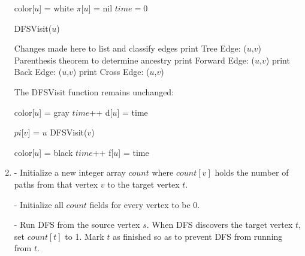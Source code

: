 \documentclass[a4paper]{report}
\begin{document}
\begin{enumerate}
    \begin{algorithmic}
        \State color[$u$] = white
        \State $\pi$[$u$] = nil
      \EndFor
      \State $time=0$


          \State DFSVisit($u$)
        \EndIf
      \EndFor

      \Comment Changes made here to list and classify edges
          \State print Tree Edge: ($u$,$v$)
        \Else 
          \Comment Parenthesis theorem to determine ancestry
            \State print Forward Edge: ($u$,$v$)
            \State print Back Edge: ($u$,$v$)
          \Else
            \State print Cross Edge: ($u$,$v$)
          \EndIf
        \EndIf
      \EndFor

    \EndFunction
    \end{algorithmic}

    The DFSVisit function remains unchanged:

    \begin{algorithmic}
      \State color[$u$] = gray
      \State $time$++
      \State d[$u$] = time

          \State $pi$[$v$] = $u$
          \State DFSVisit($v$)
        \EndIf
      \EndFor

      \State color[$u$] = black
      \State $time$++
      \State f[$u$] = time
    \EndFunction
    \end{algorithmic}

    \par
    \bigskip

    \item
      - Initialize a new integer array $count$ where $count[v]$ holds the number of paths from 
      that vertex $v$ to the target vertex $t$. 

      - Initialize all $count$ fields for every vertex to be 0. 

      - Run DFS from the source vertex $s$. When DFS discovers the target vertex $t$,
      set $count[t]$ to 1. Mark $t$ as finished so as to prevent DFS from running from $t$.


\end{enumerate}
\end{document}
